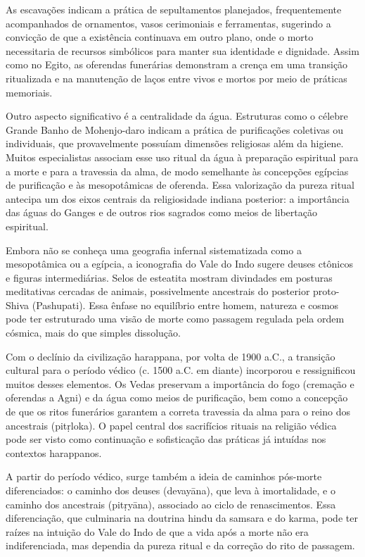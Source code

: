 As escavações indicam a prática de sepultamentos planejados, frequentemente acompanhados de ornamentos, vasos cerimoniais e ferramentas, sugerindo a convicção de que a existência continuava em outro plano, onde o morto necessitaria de recursos simbólicos para manter sua identidade e dignidade. Assim como no Egito, as oferendas funerárias demonstram a crença em uma transição ritualizada e na manutenção de laços entre vivos e mortos por meio de práticas memoriais.

Outro aspecto significativo é a centralidade da água. Estruturas como o célebre Grande Banho de Mohenjo-daro indicam a prática de purificações coletivas ou individuais, que provavelmente possuíam dimensões religiosas além da higiene. Muitos especialistas associam esse uso ritual da água à preparação espiritual para a morte e para a travessia da alma, de modo semelhante às concepções egípcias de purificação e às mesopotâmicas de oferenda. Essa valorização da pureza ritual antecipa um dos eixos centrais da religiosidade indiana posterior: a importância das águas do Ganges e de outros rios sagrados como meios de libertação espiritual.

Embora não se conheça uma geografia infernal sistematizada como a mesopotâmica ou a egípcia, a iconografia do Vale do Indo sugere deuses ctônicos e figuras intermediárias. Selos de esteatita mostram divindades em posturas meditativas cercadas de animais, possivelmente ancestrais do posterior proto-Shiva (Pashupati). Essa ênfase no equilíbrio entre homem, natureza e cosmos pode ter estruturado uma visão de morte como passagem regulada pela ordem cósmica, mais do que simples dissolução.

Com o declínio da civilização harappana, por volta de 1900 a.C., a transição cultural para o período védico (c. 1500 a.C. em diante) incorporou e ressignificou muitos desses elementos. Os Vedas preservam a importância do fogo (cremação e oferendas a Agni) e da água como meios de purificação, bem como a concepção de que os ritos funerários garantem a correta travessia da alma para o reino dos ancestrais (pit\d{r}loka). O papel central dos sacrifícios rituais na religião védica pode ser visto como continuação e sofisticação das práticas já intuídas nos contextos harappanos.

A partir do período védico, surge também a ideia de caminhos pós-morte diferenciados: o caminho dos deuses (devayāna), que leva à imortalidade, e o caminho dos ancestrais (pit\d{r}yāna), associado ao ciclo de renascimentos. Essa diferenciação, que culminaria na doutrina hindu da samsara e do karma, pode ter raízes na intuição do Vale do Indo de que a vida após a morte não era indiferenciada, mas dependia da pureza ritual e da correção do rito de passagem.

